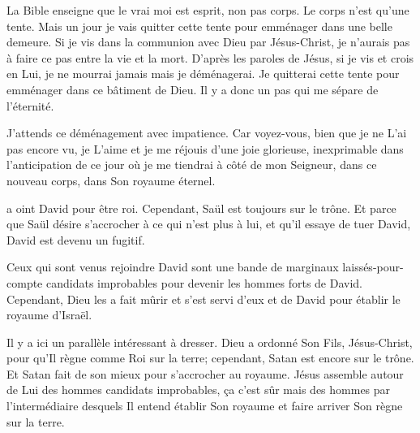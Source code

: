 La Bible enseigne que le vrai moi est esprit, non pas corps.
 Le corps n'est qu'une tente. Mais un jour je vais quitter cette tente
 pour emménager dans une belle demeure.
 Si je vis dans la communion avec Dieu par Jésus-Christ,
 je n'aurais pas à faire ce pas entre la vie et la mort.
 D'après les paroles de Jésus, si je vis et crois en Lui, je ne mourrai jamais
 \ocadr mais je déménagerai.
 Je quitterai cette tente pour emménager dans ce bâtiment de Dieu.
 Il y a donc un pas qui me sépare de l'éternité.

J'attends ce déménagement avec impatience.
 Car voyez-vous, bien que je ne L'ai pas encore vu,
 je L'aime et je me réjouis d'une joie glorieuse,
 inexprimable dans l'anticipation de ce jour où je me tiendrai
 à côté de mon Seigneur, dans ce nouveau corps, dans Son royaume éternel. 

\dvrule






 a oint David pour être roi.
 Cependant, Saül est toujours sur le trône.
 Et parce que Saül désire s'accrocher à ce qui n'est plus à lui,
 et qu'il essaye de tuer David, David est devenu un fugitif.

Ceux qui sont venus rejoindre David sont une bande de marginaux
 laissés-pour-compte \ocadr candidats improbables pour devenir
 les hommes forts de David.
 Cependant, Dieu les a fait mûrir et s'est servi d'eux
 et de David pour établir le royaume d'Israël.

Il y a ici un parallèle intéressant à dresser.
 Dieu a ordonné Son Fils, Jésus-Christ, pour qu'Il règne comme Roi sur la terre;
 cependant, Satan est encore sur le trône.
 Et Satan fait de son mieux pour s'accrocher au royaume.
 Jésus assemble autour de Lui des hommes
 \ocadr candidats improbables, ça c'est sûr \fcadr
 mais des hommes par l'intermédiaire desquels Il entend établir Son royaume
 et faire arriver Son règne sur la terre.


